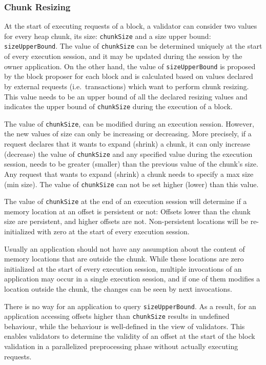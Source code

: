 \subsubsection{Chunk Resizing}\label{subsubsec:ch-resize}

At the start of executing requests of a block, a validator can consider two values for every
heap chunk, its size: \texttt{chunkSize} and a size upper bound: \texttt{sizeUpperBound}. The value of
\texttt{chunkSize} can be determined uniquely at the start of
every execution session, and it may be updated during the session by the owner application. On the other hand,
the value of \texttt{sizeUpperBound} is proposed by the block proposer for each block and is calculated based on values
declared by external requests (i.e.\ transactions) which want to perform chunk resizing. This value needs to be
an upper bound of all the declared resizing values and indicates the upper bound of \texttt{chunkSize} during the
execution of a block.

The value of \texttt{chunkSize}, can be modified during an execution session. However, the new values of size can
only be increasing or decreasing. More precisely, if a request declares that it wants to expand (shrink) a chunk, it
can only increase (decrease) the value of \texttt{chunkSize} and any specified value during the execution
session, needs to be greater (smaller) than the previous value of the chunk's size. Any request that wants to expand
(shrink) a chunk needs to specify a max size (min size). The value of \texttt{chunkSize} can not be set higher
(lower) than this value.

The value of \texttt{chunkSize} at the end of an execution session will determine if a memory location at an
offset is persistent or not: Offsets lower than the chunk size are persistent, and higher offsets are not.
Non-persistent locations will be re-initialized with zero at the start of every execution session.

Usually an application should not have any assumption about the content of memory locations that are outside the chunk.
While these locations are zero initialized at the start of every execution session, multiple
invocations of an application may occur in a single execution session, and if one of them modifies a location outside
the chunk, the changes can be seen by next invocations.

There is no way for an application to query \texttt{sizeUpperBound}. As a result, for an application
accessing offsets higher than \texttt{chunkSize} results in undefined behaviour, while the behaviour is well-defined
in the view of validators.
This enables validators to determine the validity of an offset at the start of the block validation in a parallelized
preprocessing phase without actually executing requests.

